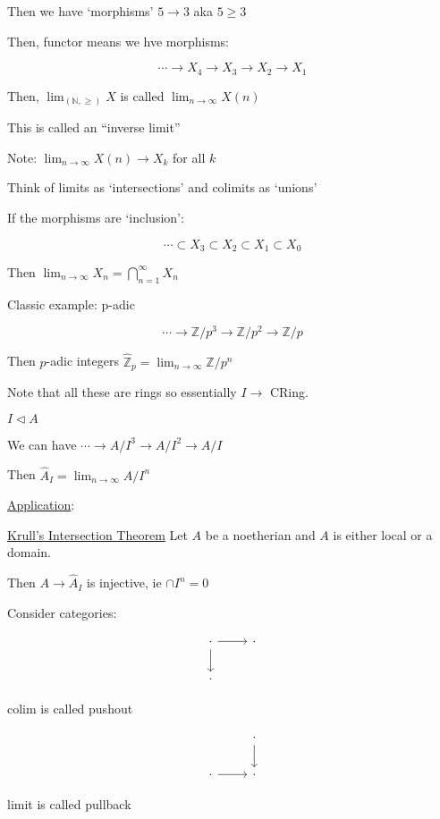 \documentclass{article}
\theoremstyle{definition}
\begin{document}
Then we have `morphisms' \(5 \to 3\) aka \(5 \geq 3\)  

Then, functor means we hve morphisms:

\[
    \cdots \to X_4 \to X_3 \to X_2 \to X_1
\]

Then, \(\lim_{(\mathbb{N} , \geq )} X\) is called \(\lim_{n \to \infty} X(n)\)

This is called an ``inverse limit''

Note: \(\lim_{n\to \infty} X(n) \to X_k\) for all \(k\) 

Think of limits as `intersections' and colimits as `unions'

If the morphisms are `inclusion':

\[
    \cdots \subset X_3 \subset X_2 \subset X_1 \subset X_0
\]

Then \(\lim_{n \to \infty} X_n = \bigcap_{n=1}^{\infty} X_n\)

Classic example: p-adic

\[
    \cdots \to  \mathbb{Z} / p^3 \to \mathbb{Z} / p^2 \to \mathbb{Z} / p
\]

Then \(p\)-adic integers \(\hat{\mathbb{Z}}_p = \lim_{n \to \infty} \mathbb{Z} / p^n\) 

Note that all these are rings so essentially \(I \to\) CRing.

\(I \triangleleft A\)

We can have \(\cdots\to A / I^3 \to A / I^2 \to A / I\) 

Then \(\hat{A}_I = \lim_{n \to \infty} A / I^n\)

\underline{Application}:

\underline{Krull's Intersection Theorem} Let \(A\) be a noetherian and \(A\) is either local or a domain.

Then \(A \to \hat{A}_I\) is injective, ie \(\cap I^n = 0\) 

Consider categories:

\[
    \begin{tikzcd}
        \cdot \ar[r] \ar[d] & \cdot \\
        \cdot
    \end{tikzcd}
\]

colim is called pushout

\[
    \begin{tikzcd}
        & \cdot \ar[d]\\
        \cdot \ar[r] & \cdot
    \end{tikzcd}
\]

limit is called pullback
\end{document}
